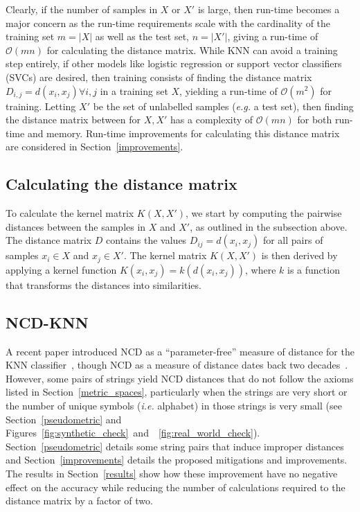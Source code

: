 \documentclass[preprint,12pt]{elsarticle}
\begin{document}
Clearly, if the number of samples in $X$ or $X'$ is large, then run-time becomes a major concern as the run-time requirements scale with the cardinality of the training set $m = | X | $ as well as the test set, $n = | X' |$, giving a run-time of $\mathcal{O}(mn)$ for calculating the distance matrix.
While KNN can avoid a training step entirely, if other models like logistic regression or support vector classifiers (SVCs) are desired, then training consists of finding the distance matrix $D_{i,j} = d(x_i, x_j) \forall i,j$ in a training set $X$, yielding a run-time of $\mathcal{O}(m^2)$ for training.
Letting $X'$ be the set of unlabelled samples (\textit{e.g.} a test set), then finding the distance matrix between for $X,X'$ has a complexity of  $\mathcal{O}(mn)$ for both run-time and memory.
Run-time improvements for calculating this distance matrix are considered in Section~\ref{improvements}.

\subsection{Calculating the distance matrix}
\label{gram_matrix}

To calculate the kernel matrix $ K(X, X') $, we start by computing the pairwise distances between the samples in $ X $ and $ X' $, as outlined in the subsection above.
The distance matrix $ D $ contains the values $ D_{ij} = d(x_i, x_j) $ for all pairs of samples $ x_i \in X $ and $ x_j \in X' $. The kernel matrix $ K(X, X') $ is then derived by applying a kernel function $ K(x_i, x_j) = k(d(x_i, x_j)) $, where $ k $ is a function that transforms the distances into similarities.




\subsection{NCD-KNN}
\label{ncd-knn}

A recent paper introduced NCD as a ``parameter-free'' measure of distance for the KNN classifier~\cite{jiang2022less}, though NCD as a measure of distance dates back two decades~\cite{ncd}.
However, some pairs of strings yield NCD distances that do not follow the axioms listed in Section~\ref{metric_spaces}, particularly when the strings are very short or the number of unique symbols (\textit{i.e.} alphabet) in those strings is very small (see Section~\ref{pseudometric} and Figures~\ref{fig:synthetic_check}~and~~\ref{fig:real_world_check}).
Section~\ref{pseudometric} details some string pairs that induce improper distances and Section~\ref{improvements} details the proposed mitigations and improvements.
The results in Section~\ref{results} show how these improvement have no negative effect on the accuracy while reducing the number of calculations required to the distance matrix by a factor of two.
\end{document}
